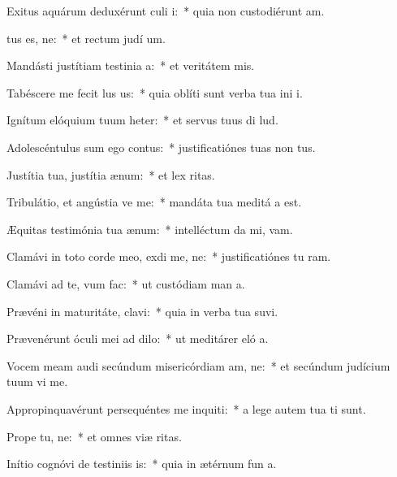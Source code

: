 \item Exitus aquárum deduxérunt culi i:~* quia non custodiérunt  am.
\item {}tus es, ne:~* et rectum judí um.
\item Mandásti justítiam testinia a:~* et veritátem  mis.
\item Tabéscere me fecit lus us:~* quia oblíti sunt verba tua ini i.
\item Ignítum elóquium tuum heter:~* et servus tuus di lud.
\item Adolescéntulus sum ego  contus:~* justificatiónes tuas non  tus.
\item Justítia tua, justítia  ænum:~* et lex  ritas.
\item Tribulátio, et angústia ve me:~* mandáta tua meditá a est.
\item Æquitas testimónia tua  ænum:~* intelléctum da mi,  vam.
\item Clamávi in toto corde meo, exdi me, ne:~* justificatiónes tu ram.
\item Clamávi ad te, vum  fac:~* ut custódiam man a.
\item Prævéni in maturitáte,  clavi:~* quia in verba tua suvi.
\item Prævenérunt óculi mei ad  dilo:~* ut meditárer eló a.
\item Vocem meam audi secúndum misericórdiam am, ne:~* et secúndum judícium tuum vi me.
\item Appropinquavérunt persequéntes me inquiti:~* a lege autem tua  ti sunt.
\item Prope  tu, ne:~* et omnes viæ  ritas.
\item Inítio cognóvi de testiniis is:~* quia in ætérnum fun a.
